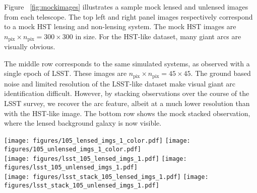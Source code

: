 \documentclass{emulateapj}
\begin{document}
Figure ~\ref{fig:mockimages} illustrates a sample mock lensed and
unlensed images from each telescope.  The top left and right panel
images respectively correspond to a mock HST lensing and non-lensing
system. The mock HST images are $n_\text{pix}\times
n_\text{pix}=300\times300$ in size.  For the HST-like dataset, many
giant arcs are visually obvious.

The middle row corresponds to the same simulated systems, as observed
with a single epoch of LSST.  These images are $n_\text{pix}\times
n_\text{pix}=45\times45$.  The ground based noise and limited
resolution of the LSST-like dataset make visual giant arc
identification difficult.  However, by stacking observations over the
course of the LSST survey, we recover the arc feature, albeit at a
much lower resolution than with the HST-like image. The bottom row
shows the mock stacked observation, where the lensed background galaxy
is now visible.

\begin{figure*}[t]\label{fig:mockimages}
\begin{center}
\texttt{[image: figures/105\_lensed\_imgs\_1\_color.pdf]}\hspace{-20pt}
\texttt{[image: figures/105\_unlensed\_imgs\_1\_color.pdf]}\\
\texttt{[image: figures/lsst\_105\_lensed\_imgs\_1.pdf]}\hspace{-20pt}
\texttt{[image: figures/lsst\_105\_unlensed\_imgs\_1.pdf]}\\
\texttt{[image: figures/lsst\_stack\_105\_lensed\_imgs\_1.pdf]}\hspace{-20pt}
\texttt{[image: figures/lsst\_stack\_105\_unlensed\_imgs\_1.pdf]}
\caption{Top row: Example mock HST images, with $n_\text{pix}\times
  n_\text{pix}=300\times300$.  The left corresponds to a strong
  gravitational lensing system with a visibly obvious giant arc.  The
  right corresponds to a non-lensing system.  Middle row: Example mock
  LSST images for a single epoch, with $n_\text{pix}\times
  n_\text{pix}=45\times45$.  The resolution and noise of a ground
  based telescope is noticeably worse.  The left and right images
  correspond to the same systems as the top row.  However, visual
  identification of giant arcs in the LSST images is very difficult.
  Bottom row: Example mock LSST images for stacked data over the 10
  year run.  Here, the arc is more visible, but not as well resolved
  as in the HST case.}
\end{center}
\end{figure*}
\end{document}
